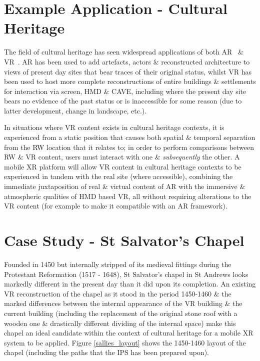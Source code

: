 \documentclass[oneside]{book}
\begin{document}
\section{Example Application - Cultural Heritage}
The field of cultural heritage has seen widespread applications of both AR~\cite{Kim2009, Wojciechowski2004, Okura2006, Magnenat-Thalmann2008a, vlahakis:archeoguide, Okura2011, Seo2010, benko:collaborative, Papagiannakis2004, Magnenat-Thalmann7, Papagiannakis2005, Papagiannakis2007, Papagiannakis2009, Taketomi2011, walczak:applications} \& VR~\cite{deamicis:gamebased, roussou:photorealism, cabral:x3dexperience, Roussou2002, Christou2006, willmott:largecomplex, Tzortzaki2002}. AR has been used to add artefacts, actors \& reconstructed architecture to views of present day sites that bear traces of their original status, whilst VR has been used to host more complete reconstructions of entire buildings \& settlements for interaction via screen, HMD \& CAVE, including where the present day site bears no evidence of the past status or is inaccessible for some reason (due to latter development, change in landscape, etc.).

In situations where VR content exists in cultural heritage contexts, it is experienced from a static position that causes both spatial \& temporal separation from the RW location that it relates to; in order to perform comparisons between RW \& VR content, users must interact with one \& \textit{subsequently} the other. A mobile XR platform will allow VR content in cultural heritage contexts to be experienced in tandem with the real site (where accessible), combining the immediate juxtaposition of real \& virtual content of AR with the immersive \& atmospheric qualities of HMD based VR, all without requiring alterations to the VR content (for example to make it compatible with an AR framework).


\pagebreak

\section{Case Study - St Salvator's Chapel}
Founded in 1450 but internally stripped of its medieval fittings during the Protestant Reformation (1517 - 1648), St Salvator's chapel in St Andrews looks markedly different in the present day than it did upon its completion. An existing VR reconstruction of the chapel as it stood in the period 1450-1460 \& the marked differences between the internal appearance of the VR building \& the current building (including the replacement of the original stone roof with a wooden one \& drastically different dividing of the internal space) make this chapel an ideal candidate within the context of cultural heritage for a mobile XR system to be applied. Figure \ref{sallies_layout} shows the 1450-1460 layout of the chapel (including the paths that the IPS has been prepared upon).
\end{document}
